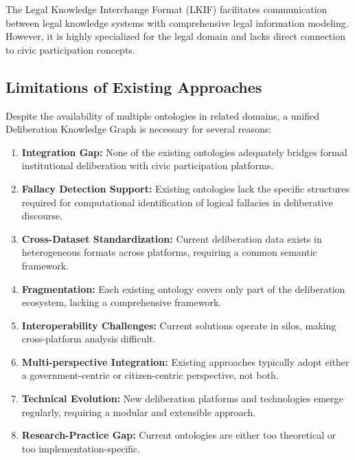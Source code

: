 \documentclass[runningheads]{llncs}  %
\begin{document}
The Legal Knowledge Interchange Format (LKIF) \cite{hoekstra2007lkif} facilitates communication between legal knowledge systems with comprehensive legal information modeling. However, it is highly specialized for the legal domain and lacks direct connection to civic participation concepts.

\subsection{Limitations of Existing Approaches}
Despite the availability of multiple ontologies in related domains, a unified Deliberation Knowledge Graph is necessary for several reasons:

\begin{enumerate}
    \item \textbf{Integration Gap:} None of the existing ontologies adequately bridges formal institutional deliberation with civic participation platforms.
    
    \item \textbf{Fallacy Detection Support:} Existing ontologies lack the specific structures required for computational identification of logical fallacies in deliberative discourse.
    
    \item \textbf{Cross-Dataset Standardization:} Current deliberation data exists in heterogeneous formats across platforms, requiring a common semantic framework.
    
    \item \textbf{Fragmentation:} Each existing ontology covers only part of the deliberation ecosystem, lacking a comprehensive framework.
    
    \item \textbf{Interoperability Challenges:} Current solutions operate in silos, making cross-platform analysis difficult.
    
    \item \textbf{Multi-perspective Integration:} Existing approaches typically adopt either a government-centric or citizen-centric perspective, not both.
    
    \item \textbf{Technical Evolution:} New deliberation platforms and technologies emerge regularly, requiring a modular and extensible approach.
    
    \item \textbf{Research-Practice Gap:} Current ontologies are either too theoretical or too implementation-specific.
\end{enumerate}
\end{document}
